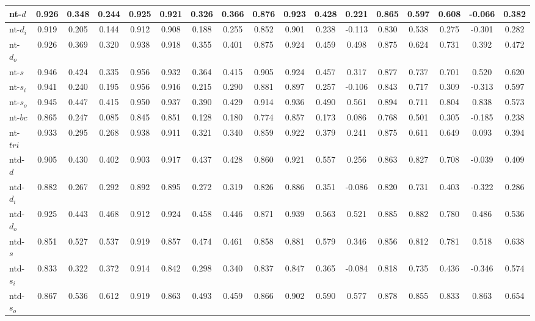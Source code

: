 \documentclass[%
 aip,
 jmp,%
 amsmath,amssymb,
 reprint,%
 floatfix,
]{revtex4-1}
\begin{document}
\begin{longtable*}{|p{2cm}|| c|c|c|c|| c|c|c|c|| c|c|c|c|| c|c|c|c|}
nt-$d$ & 0.926 & 0.348 & 0.244 & 0.925 & 0.921 & 0.326 & 0.366 & 0.876 & 0.923 & 0.428 & 0.221 & 0.865 & 0.597 & 0.608 & -0.066 & 0.382 \\ \hline
nt-$d_i$ & 0.919 & 0.205 & 0.144 & 0.912 & 0.908 & 0.188 & 0.255 & 0.852 & 0.901 & 0.238 & -0.113 & 0.830 & 0.538 & 0.275 & -0.301 & 0.282 \\ \hline
nt-$d_o$ & 0.926 & 0.369 & 0.320 & 0.938 & 0.918 & 0.355 & 0.401 & 0.875 & 0.924 & 0.459 & 0.498 & 0.875 & 0.624 & 0.731 & 0.392 & 0.472 \\ \hline
nt-$s$ & 0.946 & 0.424 & 0.335 & 0.956 & 0.932 & 0.364 & 0.415 & 0.905 & 0.924 & 0.457 & 0.317 & 0.877 & 0.737 & 0.701 & 0.520 & 0.620 \\ \hline
nt-$s_i$ & 0.941 & 0.240 & 0.195 & 0.956 & 0.916 & 0.215 & 0.290 & 0.881 & 0.897 & 0.257 & -0.106 & 0.843 & 0.717 & 0.309 & -0.313 & 0.597 \\ \hline
nt-$s_o$ & 0.945 & 0.447 & 0.415 & 0.950 & 0.937 & 0.390 & 0.429 & 0.914 & 0.936 & 0.490 & 0.561 & 0.894 & 0.711 & 0.804 & 0.838 & 0.573 \\ \hline
nt-$bc$ & 0.865 & 0.247 & 0.085 & 0.845 & 0.851 & 0.128 & 0.180 & 0.774 & 0.857 & 0.173 & 0.086 & 0.768 & 0.501 & 0.305 & -0.185 & 0.238 \\ \hline
nt-$tri$ & 0.933 & 0.295 & 0.268 & 0.938 & 0.911 & 0.321 & 0.340 & 0.859 & 0.922 & 0.379 & 0.241 & 0.875 & 0.611 & 0.649 & 0.093 & 0.394 \\ \hline
ntd-$d$ & 0.905 & 0.430 & 0.402 & 0.903 & 0.917 & 0.437 & 0.428 & 0.860 & 0.921 & 0.557 & 0.256 & 0.863 & 0.827 & 0.708 & -0.039 & 0.409 \\ \hline
ntd-$d_i$ & 0.882 & 0.267 & 0.292 & 0.892 & 0.895 & 0.272 & 0.319 & 0.826 & 0.886 & 0.351 & -0.086 & 0.820 & 0.731 & 0.403 & -0.322 & 0.286 \\ \hline
ntd-$d_o$ & 0.925 & 0.443 & 0.468 & 0.912 & 0.924 & 0.458 & 0.446 & 0.871 & 0.939 & 0.563 & 0.521 & 0.885 & 0.882 & 0.780 & 0.486 & 0.536 \\ \hline
ntd-$s$ & 0.851 & 0.527 & 0.537 & 0.919 & 0.857 & 0.474 & 0.461 & 0.858 & 0.881 & 0.579 & 0.346 & 0.856 & 0.812 & 0.781 & 0.518 & 0.638 \\ \hline
ntd-$s_i$ & 0.833 & 0.322 & 0.372 & 0.914 & 0.842 & 0.298 & 0.340 & 0.837 & 0.847 & 0.365 & -0.084 & 0.818 & 0.735 & 0.436 & -0.346 & 0.574 \\ \hline
ntd-$s_o$ & 0.867 & 0.536 & 0.612 & 0.919 & 0.863 & 0.493 & 0.459 & 0.866 & 0.902 & 0.590 & 0.577 & 0.878 & 0.855 & 0.833 & 0.863 & 0.654 \\ \hline

\end{longtable*}
\end{document}
